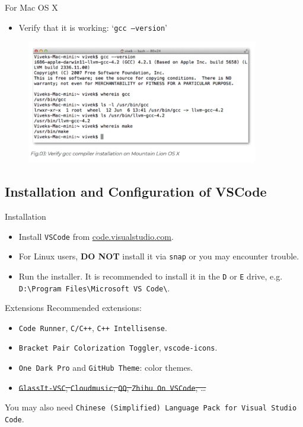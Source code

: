 \documentclass[handout]{beamer}
\begin{document}
\begin{frame}{For Mac OS X}
    \begin{itemize}
        \item Verify that it is working: `\texttt{gcc --version}'
    \end{itemize}
    \begin{figure}[h]
        \centering
        \includegraphics[width=0.9\textwidth]{img/mac_verify_gcc.png}
    \end{figure}
\end{frame}

\subsection{Installation and Configuration of VSCode}

\begin{frame}{Installation}
    \begin{itemize}
        \item Install \texttt{VSCode} from \url{code.visualstudio.com}.
        \item For Linux users, \textbf{DO NOT} install it via \texttt{snap} or you may encounter trouble.
        \pause
        \item Run the installer. It is recommended to install it in the \texttt{D} or \texttt{E} drive, e.g. \texttt{D:\textbackslash Program Files\textbackslash Microsoft VS Code\textbackslash}.
    \end{itemize}
\end{frame}

\begin{frame}{Extensions}
    Recommended extensions:
    \begin{itemize}
        \item \texttt{Code Runner}, \texttt{C/C++}, \texttt{C++ Intellisense}.
        \item \texttt{Bracket Pair Colorization Toggler}, \texttt{vscode-icons}.
        \item \texttt{One Dark Pro} and \texttt{GitHub Theme}: color themes.
        \item \sout{\texttt{GlassIt-VSC}, \texttt{Cloudmusic}, \texttt{QQ}, \texttt{Zhihu On VSCode}, \dots}
    \end{itemize}
    You may also need \texttt{Chinese (Simplified) Language Pack for Visual Studio Code}.
\end{frame}
\end{document}
